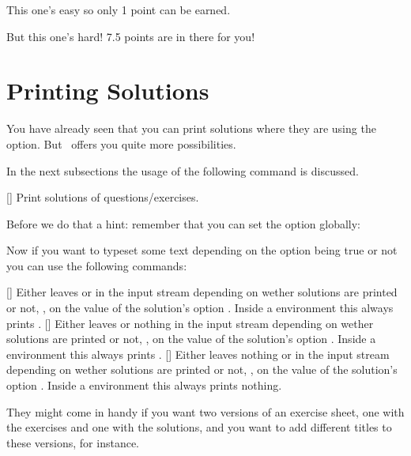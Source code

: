 \documentclass[load-preamble+]{cnltx-doc}
\begin{document}
\begin{example}[add-sourcecode-options={literate=}]
  \begin{question}{1}
    This one's easy so only 1 point can be earned.
  \end{question}
  \begin{question}{7.5}
    But this one's hard! 7.5 points are in there for you!
  \end{question}
\end{example}

\section{Printing Solutions}\label{sec:solutions}
You have already seen that you can print solutions where they are using the
 option.  But \ExSheets\ offers you quite more
possibilities.

In the next subsections the usage of the following command is discussed.
\begin{commands}
  []
    Print solutions of questions/exercises.
\end{commands}

Before we do that a hint: remember that you can set the option 
globally:
\begin{sourcecode}
\end{sourcecode}

Now if you want to typeset some text depending on the option being true or not
you can use the following commands:
\begin{commands}
  \expandable{}[]
    Either leaves  or  in the input stream
    depending on wether solutions are printed or not, \ie, on the value of the
    solution's option .  Inside a  environment
    this always prints .
  \expandable{}[]
    Either leaves  or nothing in the input stream depending on
    wether solutions are printed or not, \ie, on the value of the solution's
    option .  Inside a  environment this always
    prints .
  \expandable{}[]
    Either leaves nothing or  in the input stream depending
    on wether solutions are printed or not, \ie, on the value of the
    solution's option .  Inside a environment this
    always prints nothing. 
\end{commands}
They might come in handy if you want two versions of an exercise sheet, one
with the exercises and one with the solutions, and you want to add different
titles to these versions, for instance.
\end{document}
